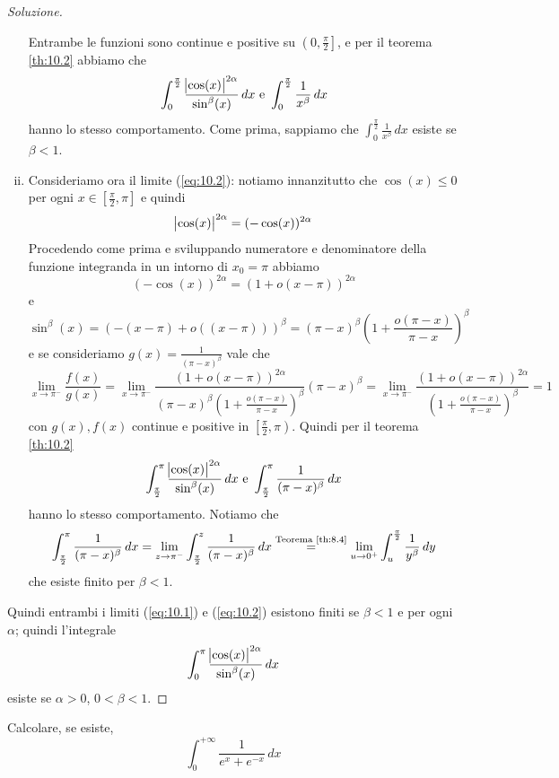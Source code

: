 \begin{proof}[Soluzione]
\begin{enumerate}[(i)]
\[        \]
        Entrambe le funzioni sono continue e positive su $\left(0, \frac{\pi}{2}\right]$, e per il teorema \ref{th:10.2} abbiamo che
        \[
        \int_0^{\frac{\pi}{2}} \frac{\abs{\cos(x)}^{2\alpha}}{\sin^\beta(x)}\, dx \ \text{e} \ \int_0^{\frac{\pi}{2}}\frac{1}{x^\beta}\, dx
        \]
        hanno lo stesso comportamento. Come prima, sappiamo che $\int_0^{\frac{\pi}{2}} \frac{1}{x^\beta}\, dx$ esiste se $\beta<1$.
        \item Consideriamo ora il limite (\ref{eq:10.2}): notiamo innanzitutto che $\cos(x)\le0$ per ogni $x\in\left[\frac{\pi}{2}, \pi\right]$ e quindi
        \[
        \abs{\cos(x)}^{2\alpha} = (-\cos(x))^{2\alpha}
        \]
        Procedendo come prima e sviluppando numeratore e denominatore della funzione integranda in un intorno di $x_0=\pi$ abbiamo
        \[
        (-\cos(x))^{2\alpha} = (1+o(x-\pi))^{2\alpha}
        \]
        e
        \[
        \sin^\beta(x) = \left(-(x-\pi)+o((x-\pi)) \right)^\beta = (\pi-x)^\beta\left(1+\frac{o(\pi-x)}{\pi-x}\right)^\beta
        \]
        e se consideriamo $g(x) = \frac{1}{(\pi-x)^\beta}$ vale che
        \[
        \lim_{x\to \pi^-} \frac{f(x)}{g(x)} = \lim_{x\to \pi^-} \frac{(1+o(x-\pi))^{2\alpha}}{(\pi-x)^\beta \left(1+\frac{o(\pi-x)}{\pi-x}\right)^\beta} (\pi-x)^\beta = \lim_{x\to \pi^-} \frac{(1+o(x-\pi))^{2\alpha}}{\left(1+\frac{o(\pi-x)}{\pi-x}\right)^\beta} = 1 
        \]
        con $g(x), f(x)$ continue e positive in $\left[\frac{\pi}{2}, \pi\right)$. Quindi per il teorema \ref{th:10.2}
        \[
        \int_{\frac{\pi}{2}}^\pi \frac{\abs{\cos(x)}^{2\alpha}}{\sin^\beta(x)}\, dx \ \text{e} \ \int_{\frac{\pi}{2}}^\pi \frac{1}{(\pi-x)^\beta}\, dx 
        \]
        hanno lo stesso comportamento. Notiamo che
        \[
        \int_{\frac{\pi}{2}}^\pi \frac{1}{(\pi-x)^\beta}\, dx = \lim_{z\to \pi^-}\int_{\frac{\pi}{2}}^z \frac{1}{(\pi-x)^\beta}\, dx \overset{\text{Teorema \ref{th:8.4}}}{=} \lim_{u\to 0^+}\int_u^{\frac{\pi}{2}} \frac{1}{y^\beta}\, dy
        \]
        che esiste finito per $\beta<1$.
    \end{enumerate}
    Quindi entrambi i limiti (\ref{eq:10.1}) e (\ref{eq:10.2}) esistono finiti se $\beta<1$ e per ogni $\alpha$; quindi l'integrale
    \[
    \int_0^\pi \frac{\abs{\cos(x)}^{2\alpha}}{\sin^\beta(x)}\, dx
    \]
    esiste se $\alpha>0$, $0<\beta<1$.
\end{proof}
\begin{exercise}
    \label{ex:10.3}
    Calcolare, se esiste,
    \[
    \int_0^{+\infty}\frac{1}{e^x+e^{-x}}\, dx
    \]
\end{exercise}
